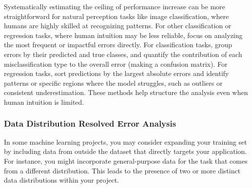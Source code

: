 \documentclass[12pt,openany, draft]{book}
\begin{document}
\begin{table}[ht]
\caption{Example predictions with noise and bandwidth effects.}
\label{tab:example_predictions}
\centering
{}
\end{table}


Systematically estimating the ceiling of performance increase can be more straightforward for natural perception tasks like image classification, where humans are highly skilled at recognizing patterns. For other classification or regression tasks, where human intuition may be less reliable, focus on analyzing the most frequent or impactful errors directly. For classification tasks, group errors by their predicted and true classes, and quantify the contribution of each misclassification type to the overall error (making a confusion matrix). For regression tasks, sort predictions by the largest absolute errors and identify patterns or specific regions where the model struggles, such as outliers or consistent underestimation. These methods help structure the analysis even when human intuition is limited.

\subsubsection{Data Distribution Resolved Error Analysis}

In some machine learning projects, you may consider expanding your training set by including data from outside the dataset that directly targets your application. For instance, you might incorporate general-purpose data for the task that comes from a different distribution. This leads to the presence of two or more distinct data distributions within your project. \newline
\end{document}
